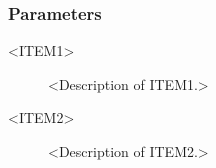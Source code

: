 
\subsubsection{Parameters}

\begin{description}

\item [<ITEM1>] <Description of ITEM1.>

\item [<ITEM2>] <Description of ITEM2.>

\end{description}








